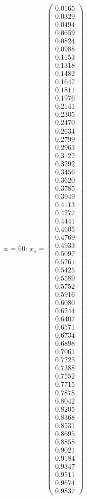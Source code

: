 \documentclass{udpreport}
\begin{document}
\begin{enumerate}
\begin{enumerate}
{{{{\begin{itemize}
\begin{itemize}
				n = 60: $x_{a} = \left(\begin{array}{c} 0.0165\\ 0.0329\\ 0.0494\\ 0.0659\\ 0.0824\\ 0.0988\\ 0.1153\\ 0.1318\\ 0.1482\\ 0.1647\\ 0.1811\\ 0.1976\\ 0.2141\\ 0.2305\\ 0.2470\\ 0.2634\\ 0.2799\\ 0.2963\\ 0.3127\\ 0.3292\\ 0.3456\\ 0.3620\\ 0.3785\\ 0.3949\\ 0.4113\\ 0.4277\\ 0.4441\\ 0.4605\\ 0.4769\\ 0.4933\\ 0.5097\\ 0.5261\\ 0.5425\\ 0.5589\\ 0.5752\\ 0.5916\\ 0.6080\\ 0.6244\\ 0.6407\\ 0.6571\\ 0.6734\\ 0.6898\\ 0.7061\\ 0.7225\\ 0.7388\\ 0.7552\\ 0.7715\\ 0.7878\\ 0.8042\\ 0.8205\\ 0.8368\\ 0.8531\\ 0.8695\\ 0.8858\\ 0.9021\\ 0.9184\\ 0.9347\\ 0.9511\\ 0.9674\\ 0.9837 \end{array}\right)$
				

\end{itemize}
\end{itemize}}}}}
\end{enumerate}
\end{enumerate}
\end{document}
